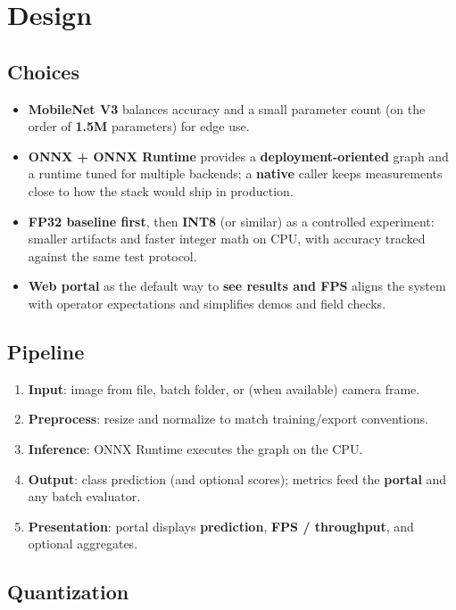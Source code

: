 \documentclass[a4paper,onesided,12pt]{report}
\begin{document}
\chapter{Design}

\section{Choices}

\begin{itemize}
\item \textbf{MobileNet V3} balances accuracy and a small parameter count (on the order of \textbf{1.5M} parameters) for edge use.
\item \textbf{ONNX + ONNX Runtime} provides a \textbf{deployment-oriented} graph and a runtime tuned for multiple backends; a \textbf{native} caller keeps measurements close to how the stack would ship in production.
\item \textbf{FP32 baseline first}, then \textbf{INT8} (or similar) as a controlled experiment: smaller artifacts and faster integer math on CPU, with accuracy tracked against the same test protocol.
\item \textbf{Web portal} as the default way to \textbf{see results and FPS} aligns the system with operator expectations and simplifies demos and field checks.
\end{itemize}

\section{Pipeline}

\begin{enumerate}
\item \textbf{Input}: image from file, batch folder, or (when available) camera frame.
\item \textbf{Preprocess}: resize and normalize to match training/export conventions.
\item \textbf{Inference}: ONNX Runtime executes the graph on the CPU.
\item \textbf{Output}: class prediction (and optional scores); metrics feed the \textbf{portal} and any batch evaluator.
\item \textbf{Presentation}: portal displays \textbf{prediction}, \textbf{FPS / throughput}, and optional aggregates.
\end{enumerate}

\section{Quantization}
\end{document}
